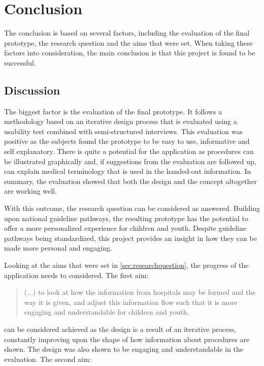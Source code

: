 \chapter{Conclusion}
\label{ch:conclusion}

The conclusion is based on several factors, including the evaluation of the final prototype, the research question and the aims that were set. When taking these factors into consideration, the main conclusion is that this project is found to be successful.

\section{Discussion}
\label{sec:discussion}

The biggest factor is the evaluation of the final prototype. It follows a methodology based on an iterative design process that is evaluated using a usability test combined with semi-structured interviews. This evaluation was positive as the subjects found the prototype to be easy to use, informative and self explanatory. There is quite a potential for the application as procedures can be illustrated graphically and, if suggestions from the evaluation are followed up, can explain medical terminology that is used in the handed-out information. In summary, the evaluation showed that both the design and the concept altogether are working well.

With this outcome, the research question can be considered as answered. Building upon national guideline pathways, the resulting prototype has the potential to offer a more personalized experience for children and youth. Despite guideline pathways being standardized, this project provides an insight in how they can be made more personal and engaging.

Looking at the aims that were set in \autoref{sec:researchquestion}, the progress of the application needs to considered. The first aim:

\begin{quote}
    (...) to look at how the information from hospitals may be formed and the way it is given, and adjust this information flow such that it is more engaging and understandable for children and youth.
\end{quote}

can be considered achieved as the design is a result of an iterative process, constantly improving upon the shape of how information about procedures are shown. The design was also shown to be engaging and understandable in the evaluation. The second aim:

